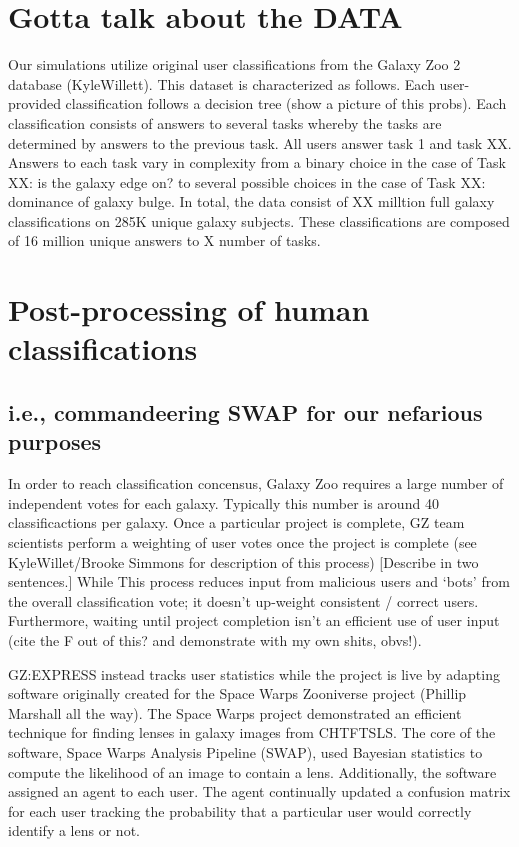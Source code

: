 \documentclass[twocolumn]{aastex6}
\begin{document}
\section{Gotta talk about the DATA} \label{sec:data}
Our simulations utilize original user classifications from the Galaxy Zoo 2 database (KyleWillett). This dataset is characterized as follows. 
Each user-provided classification follows a decision tree (show a picture of this probs). Each classification consists of answers to several tasks whereby the tasks are determined by answers to the previous task. All users answer task 1 and task XX. Answers to each task vary in complexity from a binary choice in the case of Task XX: is the galaxy edge on? to several possible choices in the case of Task XX: dominance of galaxy bulge. In total, the data consist of XX milltion full galaxy classifications on 285K unique galaxy subjects. These classifications are composed of 16 million unique answers to X number of tasks. 


\section{Post-processing of human classifications}
\subsection{ i.e., commandeering SWAP for our nefarious purposes}
In order to reach classification concensus, Galaxy Zoo requires a large number of independent votes for each galaxy. Typically this number is around 40 classificactions per galaxy. Once a particular project is complete, GZ team scientists perform a weighting of user votes once the project is complete (see KyleWillet/Brooke Simmons for description of this process) [Describe in two sentences.]  While This process reduces input from malicious users and `bots' from the overall classification vote; it doesn't up-weight consistent / correct users. Furthermore, waiting until project completion isn't an efficient use of user input (cite the F out of this? and demonstrate with my own shits, obvs!). 

GZ:EXPRESS instead tracks user statistics while the project is live by adapting software originally created for the Space Warps Zooniverse project (Phillip Marshall all the way). The Space Warps project demonstrated an efficient technique for finding lenses in galaxy images from CHTFTSLS. The core of the software, Space Warps Analysis Pipeline (SWAP), used Bayesian statistics to compute the likelihood of an image to contain a lens. Additionally, the software assigned an agent to each user. The agent continually updated a confusion matrix for each user tracking the probability that a particular user would correctly identify a lens or not.  
\end{document}
